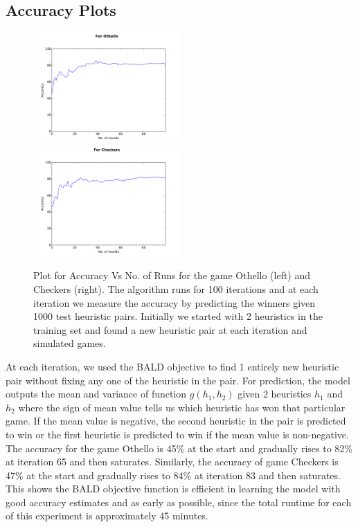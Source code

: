 \documentclass{scrartcl}
\begin{document}
{\subsection {Accuracy Plots}

\begin{figure}[H]

      \includegraphics[width=0.5\textwidth]{othello/accuracy}
\includegraphics[width=0.5\textwidth]{checkers/accuracy}
  \caption{Plot for Accuracy Vs No. of Runs for the game Othello (left) and Checkers (right). The algorithm runs for 100 iterations and at each iteration we measure the accuracy by predicting the winners given 1000 test heuristic pairs. Initially we started with 2 heuristics in the training set and found a new heuristic pair at each iteration and simulated games.}
\end{figure}



At each iteration, we used the BALD objective to find 1 entirely new heuristic pair without fixing any one of the heuristic in the pair. For prediction, the model outputs the mean and variance of function $g(h_1,h_2)$ given 2 heuristics $h_1$ and $h_2$ where the sign of mean value tells us which heuristic has won that particular game. If the mean value is negative, the second heuristic in the pair is predicted to win or the first heuristic is predicted to win if the mean value is non-negative. The accuracy for the game Othello is 45\% at the start and gradually rises to 82\% at iteration 65 and then saturates. Similarly, the accuracy of game Checkers is 47\% at the start and gradually rises to 84\% at iteration 83 and then saturates. This shows the BALD objective function is efficient in learning the model with good accuracy estimates and as early as possible, since the total runtime for each of this experiment is approximately 45 minutes.


}
\end{document}
